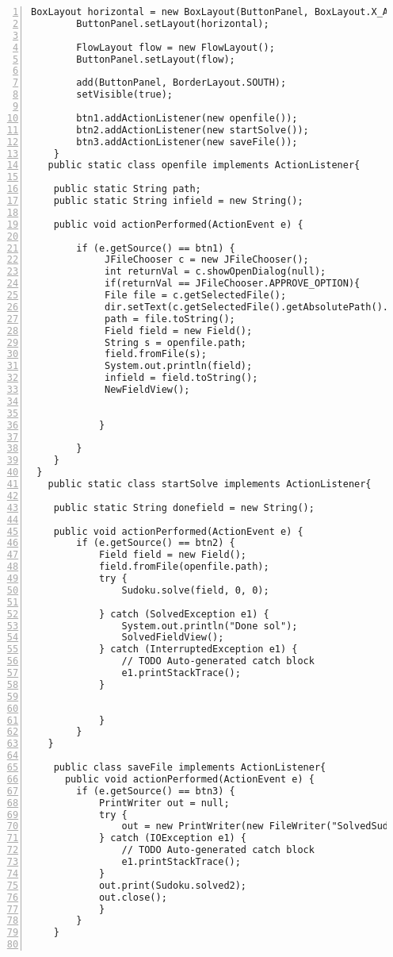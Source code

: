 \documentclass{article}
\begin{document}
\begin{lstlisting}[language=Tex,
basicstyle=\footnotesize\ttfamily,
numbers=left,stepnumber=1, 
morekeywords={assert},
tabsize=4,
breaklines=true]
        BoxLayout horizontal = new BoxLayout(ButtonPanel, BoxLayout.X_AXIS);
        ButtonPanel.setLayout(horizontal);
        
        FlowLayout flow = new FlowLayout();
        ButtonPanel.setLayout(flow);
        
        add(ButtonPanel, BorderLayout.SOUTH);
        setVisible(true);
        
        btn1.addActionListener(new openfile()); 
        btn2.addActionListener(new startSolve()); 
        btn3.addActionListener(new saveFile()); 
    }
   public static class openfile implements ActionListener{

	public static String path;
	public static String infield = new String();

	public void actionPerformed(ActionEvent e) {
		
		if (e.getSource() == btn1) {
			 JFileChooser c = new JFileChooser();
			 int returnVal = c.showOpenDialog(null);
			 if(returnVal == JFileChooser.APPROVE_OPTION){ 
			 File file = c.getSelectedFile();
			 dir.setText(c.getSelectedFile().getAbsolutePath().toString());
			 path = file.toString();
	 	 	 Field field = new Field();
			 String s = openfile.path;
			 field.fromFile(s);
			 System.out.println(field);
			 infield = field.toString();
			 NewFieldView();
			 
			 
			}
			 
		} 
	}
 }
   public static class startSolve implements ActionListener{

	public static String donefield = new String();
	   
	public void actionPerformed(ActionEvent e) {
		if (e.getSource() == btn2) {
			Field field = new Field();
			field.fromFile(openfile.path);
			try {
				Sudoku.solve(field, 0, 0);
				
			} catch (SolvedException e1) {
				System.out.println("Done sol");
				SolvedFieldView();
			} catch (InterruptedException e1) {
				// TODO Auto-generated catch block
				e1.printStackTrace();
			}
			
			
			}
		}
   }
		
    public class saveFile implements ActionListener{
	  public void actionPerformed(ActionEvent e) {
		if (e.getSource() == btn3) {
			PrintWriter out = null;
			try {
				out = new PrintWriter(new FileWriter("SolvedSudoku.txt"));
			} catch (IOException e1) {
				// TODO Auto-generated catch block
				e1.printStackTrace();
			} 
			out.print(Sudoku.solved2); 
			out.close();
			}	
		}
    }


\end{lstlisting}
\end{document}
